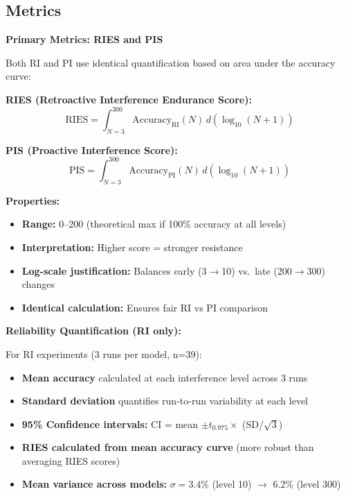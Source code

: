 \documentclass{article}
\begin{document}
\subsection{Metrics}

\textbf{Primary Metrics: RIES and PIS}

Both RI and PI use identical quantification based on area under the accuracy curve:

\textbf{RIES (Retroactive Interference Endurance Score):}
\begin{equation}
\text{RIES} = \int_{N=3}^{300} \text{Accuracy}_{\text{RI}}(N) \, d(\log_{10}(N + 1))
\end{equation}

\textbf{PIS (Proactive Interference Score):}
\begin{equation}
\text{PIS} = \int_{N=3}^{300} \text{Accuracy}_{\text{PI}}(N) \, d(\log_{10}(N + 1))
\end{equation}

\textbf{Properties:}
\begin{itemize}[itemsep=2pt,topsep=3pt,parsep=0pt]
    \item \textbf{Range:} 0--200 (theoretical max if 100\% accuracy at all levels)
    \item \textbf{Interpretation:} Higher score = stronger resistance
    \item \textbf{Log-scale justification:} Balances early (3$\rightarrow$10) vs.\ late (200$\rightarrow$300) changes
    \item \textbf{Identical calculation:} Ensures fair RI vs PI comparison
\end{itemize}

\textbf{Reliability Quantification (RI only):}

For RI experiments (3 runs per model, n=39):
\begin{itemize}[itemsep=2pt,topsep=3pt,parsep=0pt]
    \item \textbf{Mean accuracy} calculated at each interference level across 3 runs
    \item \textbf{Standard deviation} quantifies run-to-run variability at each level
    \item \textbf{95\% Confidence intervals:} CI = mean $\pm t_{0.975} \times$ (SD/$\sqrt{3}$)
    \item \textbf{RIES calculated from mean accuracy curve} (more robust than averaging RIES scores)
    \item \textbf{Mean variance across models:} $\sigma = 3.4\%$ (level 10) $\rightarrow$ 6.2\% (level 300)
\end{itemize}
\end{document}
